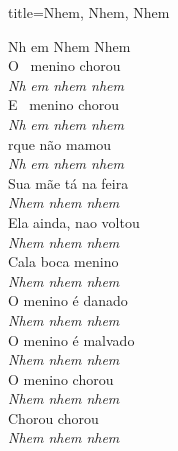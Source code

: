 \documentclass[fontsize=14pt, paper=a4, twoside, DIV=20]{scrreprt} %
\begin{document}
\begin{multicols*}{2}
\begin{song}{title={Nhem, Nhem, Nhem}}
        \begin{verse*}
            Nh em Nhem Nhem\\
            O \ menino chorou\\
            \textit{Nh} \textit{em nhem nhem}\\
            E \ menino chorou\\
            \textit{Nh} \textit{em nhem nhem}\\
            rque não mamou\\
            \textit{Nh} \textit{em nhem nhem}\\
            Sua mãe tá na feira\\
            \textit{Nhem nhem nhem}\\
            Ela ainda, nao voltou\\
            \textit{Nhem nhem nhem}\\
            Cala boca menino\\
            \textit{Nhem nhem nhem}\\
            O menino é danado\\
            \textit{Nhem nhem nhem}\\
            O menino é malvado\\
            \textit{Nhem nhem nhem}\\
            O menino chorou\\
            \textit{Nhem nhem nhem}\\
            Chorou chorou\\
            \textit{Nhem nhem nhem}\\
        \end{verse*}
\end{song}


\end{multicols*}
\end{document}
